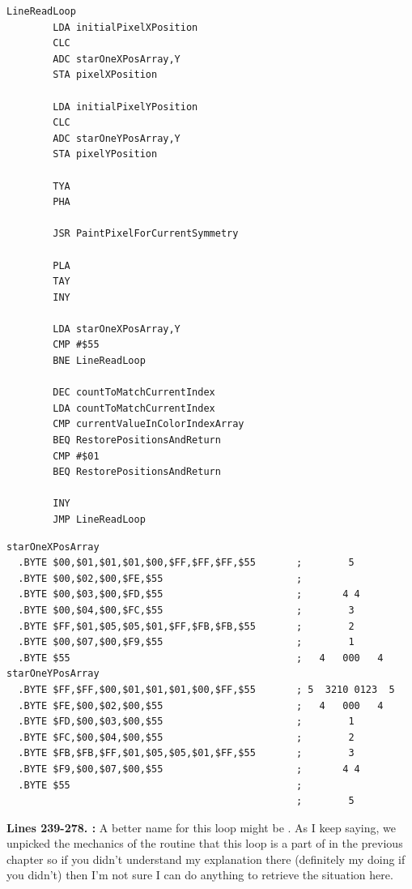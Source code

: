 \clearpage
\begin{lstlisting}[caption=The core pattern-painting loop.]
LineReadLoop   
        LDA initialPixelXPosition
        CLC 
        ADC starOneXPosArray,Y
        STA pixelXPosition

        LDA initialPixelYPosition
        CLC 
        ADC starOneYPosArray,Y
        STA pixelYPosition

        TYA 
        PHA 

        JSR PaintPixelForCurrentSymmetry

        PLA 
        TAY 
        INY 

        LDA starOneXPosArray,Y
        CMP #$55
        BNE LineReadLoop

        DEC countToMatchCurrentIndex
        LDA countToMatchCurrentIndex
        CMP currentValueInColorIndexArray
        BEQ RestorePositionsAndReturn
        CMP #$01
        BEQ RestorePositionsAndReturn

        INY 
        JMP LineReadLoop

\end{lstlisting}
\begin{lstlisting}[basicstyle=\tiny]
starOneXPosArray
  .BYTE $00,$01,$01,$01,$00,$FF,$FF,$FF,$55       ;        5       
  .BYTE $00,$02,$00,$FE,$55                       ;                
  .BYTE $00,$03,$00,$FD,$55                       ;       4 4      
  .BYTE $00,$04,$00,$FC,$55                       ;        3       
  .BYTE $FF,$01,$05,$05,$01,$FF,$FB,$FB,$55       ;        2       
  .BYTE $00,$07,$00,$F9,$55                       ;        1       
  .BYTE $55                                       ;   4   000   4  
starOneYPosArray
  .BYTE $FF,$FF,$00,$01,$01,$01,$00,$FF,$55       ; 5  3210 0123  5
  .BYTE $FE,$00,$02,$00,$55                       ;   4   000   4  
  .BYTE $FD,$00,$03,$00,$55                       ;        1       
  .BYTE $FC,$00,$04,$00,$55                       ;        2       
  .BYTE $FB,$FB,$FF,$01,$05,$05,$01,$FF,$55       ;        3       
  .BYTE $F9,$00,$07,$00,$55                       ;       4 4      
  .BYTE $55                                       ;                
                                                  ;        5       
\end{lstlisting}
\clearpage

\textbf{Lines 239-278. :} A better name for this loop might be . As I keep saying, we unpicked the mechanics
of the  routine that this loop is a part of in the previous chapter so if you didn't understand my explanation there (definitely my doing if you didn't)
then I'm not sure I can do anything to retrieve the situation here.


